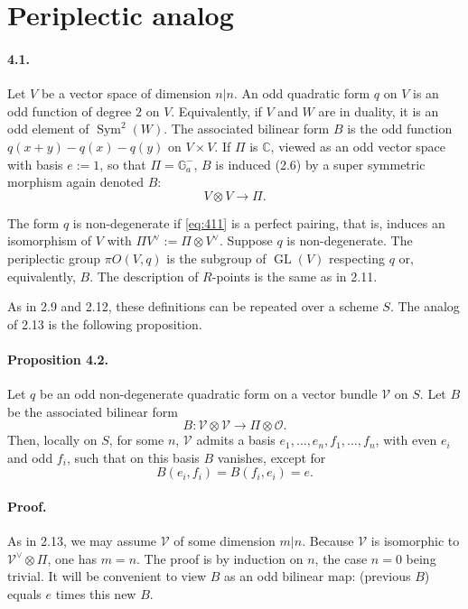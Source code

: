 \documentclass[11pt]{article}
\newcommand{\C}{\mathbb C}
\newcommand{\GL}{\operatorname{GL}}
\newcommand{\Sym}{\operatorname{Sym}}
\newcommand{\Ga}{\mathbb G_a}
\newcommand{\calO}{\mathcal O}
\begin{document}
\section{Periplectic analog}

\paragraph{4.1.}
Let $V$ be a vector space of dimension $n|n$. An odd quadratic form $q$ on $V$ is an odd function of degree $2$ on $V$. Equivalently, if $V$ and $W$ are in duality, it is an odd element of $\Sym^2(W)$. The associated bilinear form $B$ is the odd function $q(x+y)-q(x)-q(y)$ on $V\times V$. If $\Pi$ is $\C$, viewed as an odd vector space with basis $e:=1$, so that $\Pi=\Ga^-$, $B$ is induced (2.6) by a super symmetric morphism again denoted $B$:
\begin{equation}
\label{eq:411}
V\otimes V\longrightarrow \Pi.
\end{equation}

The form $q$ is non-degenerate if \eqref{eq:411} is a perfect pairing, that is, induces an isomorphism of $V$ with $\Pi V^\vee:=\Pi\otimes V^\vee$. Suppose $q$ is non-degenerate. The periplectic group $\pi O(V,q)$ is the subgroup of $\GL(V)$ respecting $q$ or, equivalently, $B$. The description of $R$-points is the same as in 2.11.

As in 2.9 and 2.12, these definitions can be repeated over a scheme $S$. The analog of 2.13 is the following proposition.

\paragraph{Proposition 4.2.}
Let $q$ be an odd non-degenerate quadratic form on a vector bundle $\mathcal V$ on $S$. Let $B$ be the associated bilinear form
\[
B:\mathcal V\otimes\mathcal V\longrightarrow \Pi\otimes\calO.
\]
Then, locally on $S$, for some $n$, $\mathcal V$ admits a basis $e_1,\ldots,e_n,f_1,\ldots,f_n$, with even $e_i$ and odd $f_i$, such that on this basis $B$ vanishes, except for
\[
B(e_i,f_i)=B(f_i,e_i)=e.
\]

\paragraph{Proof.}
As in 2.13, we may assume $\mathcal V$ of some dimension $m|n$. Because $\mathcal V$ is isomorphic to $\mathcal V^\vee\otimes\Pi$, one has $m=n$. The proof is by induction on $n$, the case $n=0$ being trivial. It will be convenient to view $B$ as an odd bilinear map: (previous $B$) equals $e$ times this new $B$.
\end{document}
